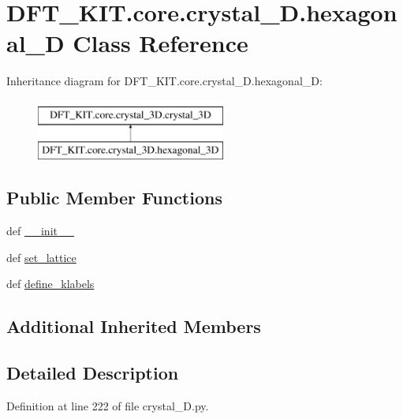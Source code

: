 \hypertarget{class_d_f_t___k_i_t_1_1core_1_1crystal__3_d_1_1hexagonal__3_d}{\section{D\+F\+T\+\_\+\+K\+I\+T.\+core.\+crystal\+\_\+D.\+hexagonal\+\_\+D Class Reference}
\label{class_d_f_t___k_i_t_1_1core_1_1crystal__3_d_1_1hexagonal__3_d}
}
Inheritance diagram for D\+F\+T\+\_\+\+K\+I\+T.\+core.\+crystal\+\_\+D.\+hexagonal\+\_\+D\+:\begin{figure}[H]
\begin{center}
\leavevmode
\includegraphics[height=2.000000cm]{class_d_f_t___k_i_t_1_1core_1_1crystal__3_d_1_1hexagonal__3_d}
\end{center}
\end{figure}
\subsection*{Public Member Functions}
\begin{DoxyCompactItemize}
\item 
def \hyperlink{class_d_f_t___k_i_t_1_1core_1_1crystal__3_d_1_1hexagonal__3_d_acf922212dc726c10f1377733bdfbbf60}{\+\_\+\+\_\+init\+\_\+\+\_\+}
\item 
def \hyperlink{class_d_f_t___k_i_t_1_1core_1_1crystal__3_d_1_1hexagonal__3_d_a8d3268633d8f2ae7014c1051c60639fe}{set\+\_\+lattice}
\item 
def \hyperlink{class_d_f_t___k_i_t_1_1core_1_1crystal__3_d_1_1hexagonal__3_d_aedd3173cbf84663166eeae0c78f4f3bc}{define\+\_\+klabels}
\end{DoxyCompactItemize}
\subsection*{Additional Inherited Members}


\subsection{Detailed Description}


Definition at line 222 of file crystal\+\_\+D.\+py.



